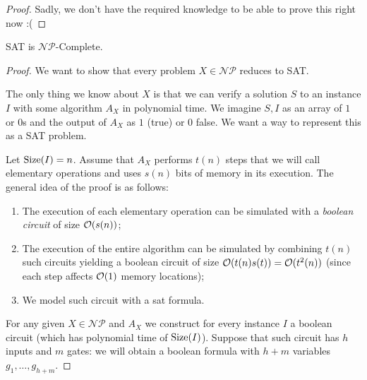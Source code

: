 \documentclass[12pt]{extarticle}
\newcommand{\NP}{{\mathcal{NP}}}
\newcommand{\NPC}{$\NP$-Complete}
\begin{document}
\begin{proof}
    Sadly, we don't have the required knowledge to be able to prove this right now :(
    \phantom{)} %
\end{proof}

\begin{theorem}
    SAT is \NPC.
\end{theorem}

\begin{proof}
    We want to show that every problem $X \in \NP$ reduces to SAT.

    The only thing we know about $X$ is that we can verify a solution $S$ to an instance $I$ with some algorithm $A_X$ in polynomial time.
    We imagine $S, I$ as an array of $1$ or $0$s and the output of $A_X$ as $1$ (true) or $0$ false.
    We want a way to represent this as a SAT problem.

    Let ${\operatorfont Size}(I) = n$. Assume that $A_X$ performs $t(n)$ steps that we will call elementary operations and uses $s(n)$ bits of memory in its execution.
    The general idea of the proof is as follows:
    \begin{enumerate}[label=\roman*.]
        \item The execution of each elementary operation can be simulated with a \emph{boolean circuit} of size $\mathcal{O}(s(n))$;
        \item The execution of the entire algorithm can be simulated by combining $t(n)$ such circuits yielding a boolean circuit of size $\mathcal{O}(t(n)s(t)) = \mathcal{O}(t^2(n))$ (since each step affects $\mathcal{O}(1)$ memory locations);
        \item We model such circuit with a sat formula.
    \end{enumerate}

    For any given $X \in \NP$ and $A_X$ we construct for every instance $I$ a boolean circuit (which has polynomial time of ${\operatorfont Size}(I)$).
    Suppose that such circuit has $h$ inputs and $m$ gates: we will obtain a boolean formula with $h+m$ variables $g_1, \dots, g_{h+m}$.


\end{proof}
\end{document}
